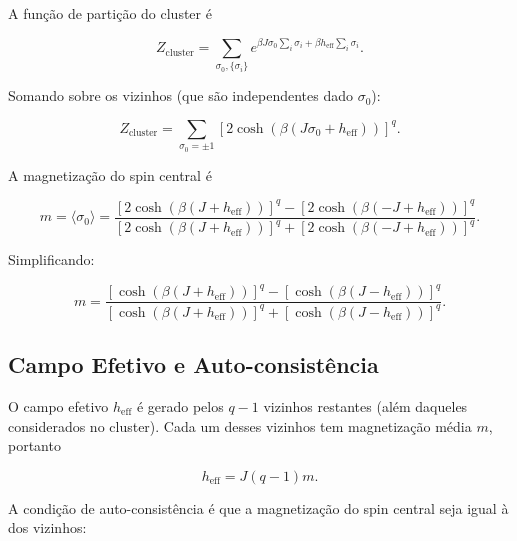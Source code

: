 \documentclass[12pt]{article}
\begin{document}
A função de partição do cluster é

\begin{equation}
    Z_{\text{cluster}} = \sum_{\sigma_0, \{\sigma_i\}} e^{\beta J \sigma_0 \sum_i \sigma_i + \beta h_{\text{eff}} \sum_i \sigma_i}.
\end{equation}

Somando sobre os vizinhos (que são independentes dado \(\sigma_0\)):

\begin{equation}
    Z_{\text{cluster}} = \sum_{\sigma_0=\pm1} \left[ 2 \cosh\left( \beta (J \sigma_0 + h_{\text{eff}}) \right) \right]^q.
\end{equation}

A magnetização do spin central é

\begin{equation}
    m = \langle \sigma_0 \rangle = \frac{ \left[ 2 \cosh\left( \beta (J + h_{\text{eff}}) \right) \right]^q - \left[ 2 \cosh\left( \beta (-J + h_{\text{eff}}) \right) \right]^q }
                      { \left[ 2 \cosh\left( \beta (J + h_{\text{eff}}) \right) \right]^q + \left[ 2 \cosh\left( \beta (-J + h_{\text{eff}}) \right) \right]^q }.
\end{equation}

Simplificando:

\begin{equation}
    m = \frac{ \left[ \cosh\left( \beta (J + h_{\text{eff}}) \right) \right]^q - \left[ \cosh\left( \beta (J - h_{\text{eff}}) \right) \right]^q }
             { \left[ \cosh\left( \beta (J + h_{\text{eff}}) \right) \right]^q + \left[ \cosh\left( \beta (J - h_{\text{eff}}) \right) \right]^q }.
\end{equation}

\subsection{Campo Efetivo e Auto-consistência}

O campo efetivo \(h_{\text{eff}}\) é gerado pelos \(q-1\) vizinhos restantes (além daqueles considerados no cluster). Cada um desses vizinhos tem magnetização média \(m\), portanto

\begin{equation}
    h_{\text{eff}} = J (q-1) m.
\end{equation}

A condição de auto-consistência é que a magnetização do spin central seja igual à dos vizinhos:
\end{document}
